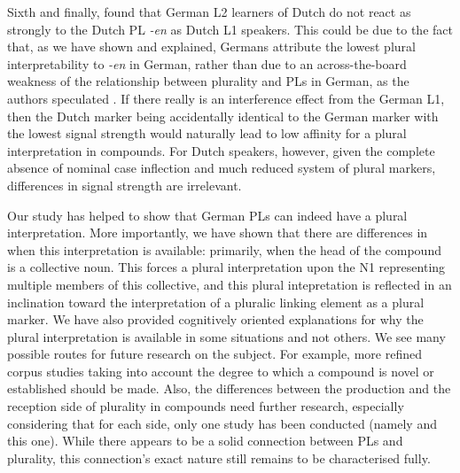 Sixth and finally, \textcite{BangaEa2013a} found that German L2 learners of Dutch do not react as strongly to the Dutch PL \textit{-en} as Dutch L1 speakers.
This could be due to the fact that, as we have shown and explained, Germans attribute the lowest plural interpretability to \textit{-en} in German, rather than due to an across-the-board weakness of the relationship between plurality and PLs in German, as the authors speculated \parencite[45]{BangaEa2013a}.
If there really is an interference effect from the German L1, then the Dutch marker being accidentally identical to the German marker with the lowest signal strength would naturally lead to low affinity for a plural interpretation in compounds.
For Dutch speakers, however, given the complete absence of nominal case inflection and much reduced system of plural markers, differences in signal strength are irrelevant.

Our study has helped to show that German PLs can indeed have a plural interpretation.
More importantly, we have shown that there are differences in when this interpretation is available: primarily, when the head of the compound is a collective noun.
This forces a plural interpretation upon the N1 representing multiple members of this collective, and this plural intepretation is reflected in an inclination toward the interpretation of a pluralic linking element as a plural marker.
We have also provided cognitively oriented explanations for why the plural interpretation is available in some situations and not others.
We see many possible routes for future research on the subject.
For example, more refined corpus studies taking into account the degree to which a compound is novel or established should be made.
Also, the differences between the production and the reception side of plurality in compounds need further research, especially considering that for each side, only one study has been conducted (namely \citealt{KoesterEa2004} and this one).
While there appears to be a solid connection between PLs and plurality, this connection's exact nature still remains to be characterised fully.
